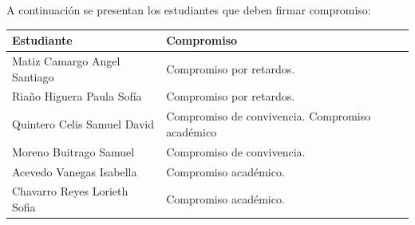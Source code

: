 \documentclass[spanish,11pt,a4paper]{article}
\begin{document}
	\begin{flushleft}
		A continuación se presentan los estudiantes que deben firmar compromiso:\\
	\end{flushleft}
	\vspace{0.5cm}
	\begin{longtable}{|p{6cm}|p{5cm}|}
		\hline
		\textbf{Estudiante} & \textbf{Compromiso} \\
		\hline\hline
		Matiz Camargo Angel Santiago & Compromiso por retardos.  \\
		\hline
		Riaño Higuera Paula Sofía & Compromiso por retardos.  \\
		\hline
		Quintero Celis Samuel David & Compromiso de convivencia.
		Compromiso académico  \\
		\hline
		Moreno Buitrago Samuel & Compromiso de convivencia.  \\
		\hline
		Acevedo Vanegas Isabella & Compromiso académico.  \\
		\hline
		Chavarro Reyes Lorieth Sofia & Compromiso académico.  \\
		\hline
	\end{longtable}
	
	
\end{document}
